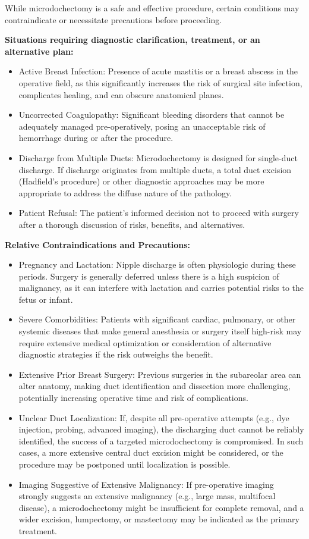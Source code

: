While microdochectomy is a safe and effective procedure, certain conditions may contraindicate or necessitate precautions before proceeding.

\textbf{Situations requiring diagnostic clarification, treatment, or an alternative plan:}
\begin{itemize}
  \item Active Breast Infection: Presence of acute mastitis or a breast abscess in the operative field, as this significantly increases the risk of surgical site infection, complicates healing, and can obscure anatomical planes.
  \item Uncorrected Coagulopathy: Significant bleeding disorders that cannot be adequately managed pre-operatively, posing an unacceptable risk of hemorrhage during or after the procedure.
  \item Discharge from Multiple Ducts: Microdochectomy is designed for single-duct discharge. If discharge originates from multiple ducts, a total duct excision (Hadfield's procedure) or other diagnostic approaches may be more appropriate to address the diffuse nature of the pathology.
  \item Patient Refusal: The patient's informed decision not to proceed with surgery after a thorough discussion of risks, benefits, and alternatives.
\end{itemize}

\textbf{Relative Contraindications and Precautions:}
\begin{itemize}
  \item Pregnancy and Lactation: Nipple discharge is often physiologic during these periods. Surgery is generally deferred unless there is a high suspicion of malignancy, as it can interfere with lactation and carries potential risks to the fetus or infant.
  \item Severe Comorbidities: Patients with significant cardiac, pulmonary, or other systemic diseases that make general anesthesia or surgery itself high-risk may require extensive medical optimization or consideration of alternative diagnostic strategies if the risk outweighs the benefit.
  \item Extensive Prior Breast Surgery: Previous surgeries in the subareolar area can alter anatomy, making duct identification and dissection more challenging, potentially increasing operative time and risk of complications.
  \item Unclear Duct Localization: If, despite all pre-operative attempts (e.g., dye injection, probing, advanced imaging), the discharging duct cannot be reliably identified, the success of a targeted microdochectomy is compromised. In such cases, a more extensive central duct excision might be considered, or the procedure may be postponed until localization is possible.
  \item Imaging Suggestive of Extensive Malignancy: If pre-operative imaging strongly suggests an extensive malignancy (e.g., large mass, multifocal disease), a microdochectomy might be insufficient for complete removal, and a wider excision, lumpectomy, or mastectomy may be indicated as the primary treatment.
\end{itemize}

